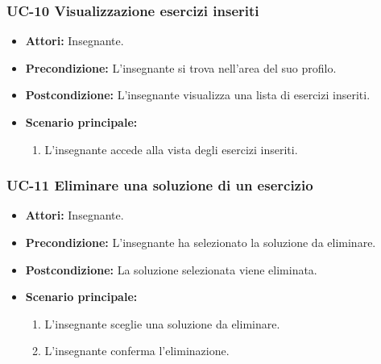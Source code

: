\subsubsection{UC-10 Visualizzazione esercizi inseriti}
\begin{itemize}
\item \textbf{Attori: }Insegnante.
		\item \textbf{Precondizione: }L'insegnante si trova nell'area del suo profilo.
		\item \textbf{Postcondizione: }L'insegnante visualizza una lista di esercizi inseriti. 
		\item \textbf{Scenario principale: }
		\begin{enumerate}
		\item L'insegnante accede alla vista degli esercizi inseriti.
		\end{enumerate}
	\end{itemize}
	
\subsubsection{UC-11 Eliminare una soluzione di un esercizio}
\begin{itemize}
\item \textbf{Attori: }Insegnante.
		\item \textbf{Precondizione: }L'insegnante ha selezionato la soluzione da eliminare.
		\item \textbf{Postcondizione: }La soluzione selezionata viene eliminata. 
		\item \textbf{Scenario principale: }
		\begin{enumerate}
		\item L'insegnante sceglie una soluzione da eliminare.
		\item L'insegnante conferma l'eliminazione.
		\end{enumerate}
\end{itemize}

